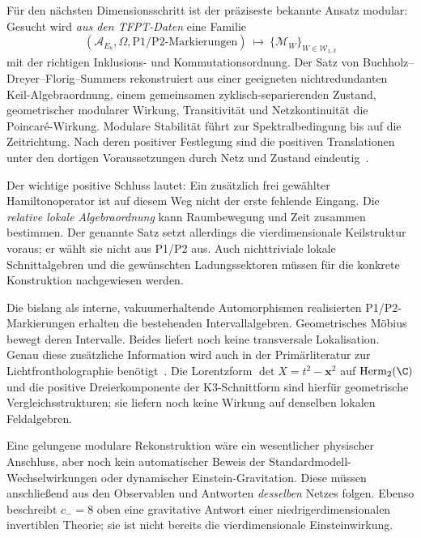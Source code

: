 Für den nächsten Dimensionsschritt ist der präziseste bekannte Ansatz modular: Gesucht wird \emph{aus den TFPT-Daten} eine Familie
\begin{equation}\label{eq:localizationtarget}
(\mathcal A_{E_8},\Omega,\text{P1/P2-Markierungen})
\ \longmapsto\
\{\mathcal M_W\}_{W\in\mathcal W_{1,3}}
\end{equation}
mit der richtigen Inklusions- und Kommutationsordnung. Der Satz von Buchholz--Dreyer--Florig--Summers rekonstruiert aus einer geeigneten nichtredundanten Keil-Algebraordnung, einem gemeinsamen zyklisch-separierenden Zustand, geometrischer modularer Wirkung, Transitivität und Netzkontinuität die Poincaré-Wirkung. Modulare Stabilität führt zur Spektralbedingung bis auf die Zeitrichtung. Nach deren positiver Festlegung sind die positiven Translationen unter den dortigen Voraussetzungen durch Netz und Zustand eindeutig~\cite{bdfs}.

Der wichtige positive Schluss lautet: Ein zusätzlich frei gewählter Hamiltonoperator ist auf diesem Weg nicht der erste fehlende Eingang. Die \emph{relative lokale Algebraordnung} kann Raumbewegung und Zeit zusammen bestimmen. Der genannte Satz setzt allerdings die vierdimensionale Keilstruktur voraus; er wählt sie nicht aus P1/P2 aus. Auch nichttriviale lokale Schnittalgebren und die gewünschten Ladungssektoren müssen für die konkrete Konstruktion nachgewiesen werden.

Die bislang als interne, vakuumerhaltende Automorphismen realisierten P1/P2-Markierungen erhalten die bestehenden Intervallalgebren. Geometrisches Möbius bewegt deren Intervalle. Beides liefert noch keine transversale Lokalisation. Genau diese zusätzliche Information wird auch in der Primärliteratur zur Lichtfrontholographie benötigt~\cite{schroer}. Die Lorentzform $\det X=t^2-\mathbf x^2$ auf $\mathrm{Herm}_2(\C)$ und die positive Dreierkomponente der K3-Schnittform sind hierfür geometrische Vergleichsstrukturen; sie liefern noch keine Wirkung auf denselben lokalen Feldalgebren.

Eine gelungene modulare Rekonstruktion wäre ein wesentlicher physischer Anschluss, aber noch kein automatischer Beweis der Standardmodell-Wechselwirkungen oder dynamischer Einstein-Gravitation. Diese müssen anschließend aus den Observablen und Antworten \emph{desselben} Netzes folgen. Ebenso beschreibt $c_-=8$ oben eine gravitative Antwort einer niedrigerdimensionalen invertiblen Theorie; sie ist nicht bereits die vierdimensionale Einsteinwirkung.

